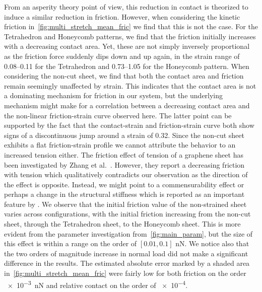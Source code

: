 From an asperity theory point of view, this reduction in contact is theorized to
induce a similar reduction in friction. However, when considering the kinetic
friction in~\cref{fig:multi_stretch_mean_fric} we find that this is not the
case. For the Tetrahedron and Honeycomb patterns, we find that the friction
initially increases with a decreasing contact area. Yet, these are not simply
inversely proportional as the friction force suddenly dips down and up again, in
the strain range of 0.08--0.11 for the Tetrahedron and 0.73--1.05 for the
Honeycomb pattern. When considering the non-cut sheet, we find that both the
contact area and friction remain seemingly unaffected by strain. This indicates
that the contact area is not a dominating mechanism for friction in our system,
but the underlying mechanism might make for a correlation between a decreasing
contact area and the non-linear friction-strain curve observed here. The latter
point can be supported by the fact that the contact-strain and friction-strain
curve both show signs of a discontinuous jump around a strain of 0.32. Since the
non-cut sheet exhibits a flat friction-strain profile we cannot attribute the
behavior to an increased tension either. The friction effect of tension of a
graphene sheet has been investigated by Zhang et al.~\cite{zhang_tuning_2019}.
However, they report a decreasing friction with tension which qualitatively
contradicts our observation as the direction of the effect is opposite. Instead,
we might point to a commensurability effect or perhaps a change in the
structural stiffness which is reported as an important feature by
\cite{Kim_2012}. We observe that the initial friction value of the non-strained
sheet varies across configurations, with the initial friction increasing from
the non-cut sheet, through the Tetrahedron sheet, to the Honeycomb sheet. This
is more evident from the parameter investigation from~\cref{fig:main_param}, but the size of this effect is within a range on the order of $[0.01, 0.1]$ nN.
We notice also that the two orders of magnitude increase in normal load did not
make a significant difference in the results. The estimated absolute error
marked by a shaded area in~\cref{fig:multi_stretch_mean_fric} were fairly low
for both friction on the order \SI{e-3}{nN} and relative contact on the order of
\num{e-4}.


